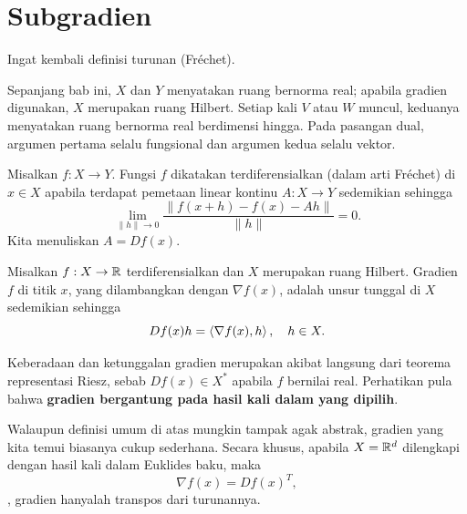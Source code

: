 \chapter{Subgradien}\label{d90-hab:ch:subgradien}

Ingat kembali definisi turunan (Fréchet).

Sepanjang bab ini, \(X\) dan \(Y\) menyatakan ruang bernorma real; apabila gradien digunakan, \(X\) merupakan ruang Hilbert. Setiap kali \(V\) atau \(W\) muncul, keduanya menyatakan ruang bernorma real berdimensi hingga. Pada pasangan dual, argumen pertama selalu fungsional dan argumen kedua selalu vektor.

\begin{defn}
    Misalkan $f:X\rightarrow Y$. Fungsi $f$ dikatakan terdiferensialkan (dalam arti Fréchet) di $x\in X$ apabila terdapat pemetaan linear kontinu $A:X\rightarrow Y$ sedemikian sehingga
    \begin{equation}
        \lim_{\|h\|\rightarrow 0}\frac{\| f(x+h) - f(x)  -Ah\|}{\|h\|}= 0.
    \end{equation}
    Kita menuliskan $A=Df(x)$.
\end{defn}

\begin{defn}[Gradien]
    Misalkan $f:X\rightarrow \mathbb{R}$ terdiferensialkan dan $X$ merupakan ruang Hilbert. Gradien $f$ di titik $x$, yang dilambangkan dengan $\nabla f(x)$, adalah unsur tunggal di $X$ sedemikian sehingga
    \begin{equation}
        Df(x)h =  \left\langle\nabla f(x) , h\right\rangle, \quad h\in X.
    \end{equation}
\end{defn}

Keberadaan dan ketunggalan gradien merupakan akibat langsung dari teorema representasi Riesz, sebab $Df(x)\in X^*$ apabila $f$ bernilai real. Perhatikan pula bahwa \textbf{gradien bergantung pada hasil kali dalam yang dipilih}.

Walaupun definisi umum di atas mungkin tampak agak abstrak, gradien yang kita temui biasanya cukup sederhana. Secara khusus, apabila $X=\mathbb{R}^d$ dilengkapi dengan hasil kali dalam Euklides baku, maka
\begin{equation}
    \nabla f(x) = Df(x)^T,
\end{equation}
\ie, gradien hanyalah transpos dari turunannya.

